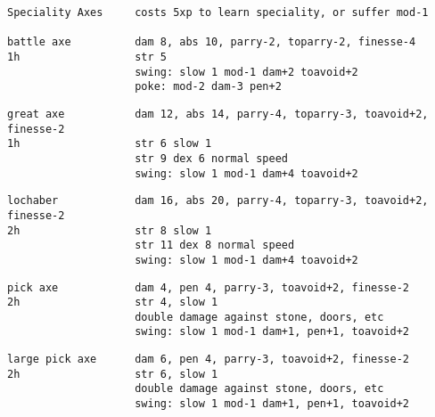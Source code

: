 \goodbreak \small \begin{samepage} \begin{verbatim}
Speciality Axes     costs 5xp to learn speciality, or suffer mod-1

battle axe          dam 8, abs 10, parry-2, toparry-2, finesse-4
1h                  str 5
                    swing: slow 1 mod-1 dam+2 toavoid+2
                    poke: mod-2 dam-3 pen+2
\end{verbatim} \blocklistgap \begin{verbatim}
great axe           dam 12, abs 14, parry-4, toparry-3, toavoid+2, finesse-2
1h                  str 6 slow 1
                    str 9 dex 6 normal speed
                    swing: slow 1 mod-1 dam+4 toavoid+2
\end{verbatim} \blocklistgap \begin{verbatim}
lochaber            dam 16, abs 20, parry-4, toparry-3, toavoid+2, finesse-2
2h                  str 8 slow 1
                    str 11 dex 8 normal speed
                    swing: slow 1 mod-1 dam+4 toavoid+2
\end{verbatim} \blocklistgap \begin{verbatim}
pick axe            dam 4, pen 4, parry-3, toavoid+2, finesse-2
2h                  str 4, slow 1
                    double damage against stone, doors, etc
                    swing: slow 1 mod-1 dam+1, pen+1, toavoid+2
\end{verbatim} \blocklistgap \begin{verbatim}
large pick axe      dam 6, pen 4, parry-3, toavoid+2, finesse-2
2h                  str 6, slow 1
                    double damage against stone, doors, etc
                    swing: slow 1 mod-1 dam+1, pen+1, toavoid+2
\end{verbatim} \end{samepage} \normalsize \goodbreak

\

